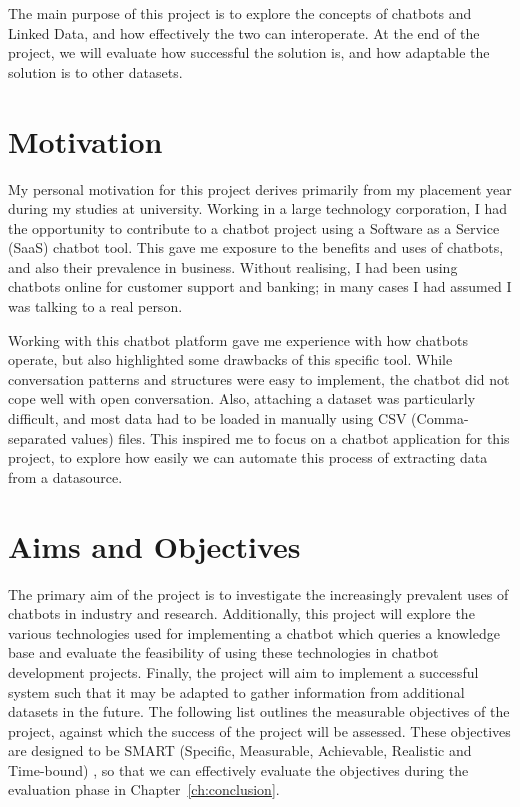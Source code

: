 The main purpose of this project is to explore the concepts of chatbots and Linked Data, and how effectively the two can interoperate. At the end of the project, we will evaluate how successful the solution is, and how adaptable the solution is to other datasets.

\section{Motivation}
My personal motivation for this project derives primarily from my placement year during my studies at university. Working in a large technology corporation, I had the opportunity to contribute to a chatbot project using a Software as a Service (SaaS) chatbot tool. This gave me exposure to the benefits and uses of chatbots, and also their prevalence in business. Without realising, I had been using chatbots online for customer support and banking; in many cases I had assumed I was talking to a real person.

Working with this chatbot platform gave me experience with how chatbots operate, but also highlighted some drawbacks of this specific tool. While conversation patterns and structures were easy to implement, the chatbot did not cope well with open conversation. Also, attaching a dataset was particularly difficult, and most data had to be loaded in manually using CSV (Comma-separated values) files. This inspired me to focus on a chatbot application for this project, to explore how easily we can automate this process of extracting data from a datasource.

\newpage
\section{Aims and Objectives}
\label{sec:aims}
The primary aim of the project is to investigate the increasingly prevalent uses of chatbots in industry and research. Additionally, this project will explore the various technologies used for implementing a chatbot which queries a knowledge base and evaluate the feasibility of using these technologies in chatbot development projects. Finally, the project will aim to implement a successful system such that it may be adapted to gather information from additional datasets in the future. The following list outlines the measurable objectives of the project, against which the success of the project will be assessed. These objectives are designed to be SMART (Specific, Measurable, Achievable, Realistic and Time-bound) \cite{smart}, so that we can effectively evaluate the objectives during the evaluation phase in Chapter~\ref{ch:conclusion}.

